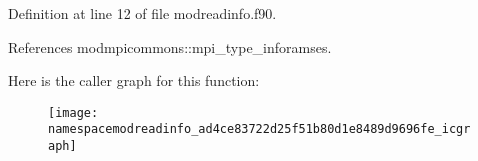 Definition at line 12 of file modreadinfo.\+f90.



References modmpicommons\+::mpi\+\_\+type\+\_\+inforamses.



Here is the caller graph for this function\+:\nopagebreak
\begin{figure}[H]
\begin{center}
\leavevmode
\texttt{[image: namespacemodreadinfo\_ad4ce83722d25f51b80d1e8489d9696fe\_icgraph]}
\end{center}
\end{figure}


